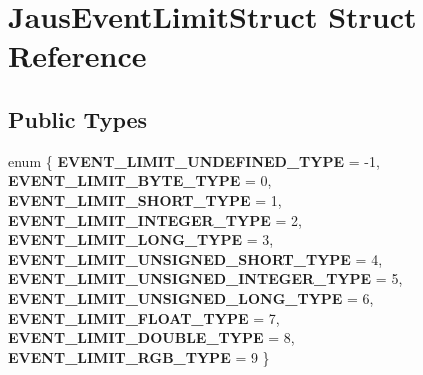 \hypertarget{struct_jaus_event_limit_struct}{\section{\-Jaus\-Event\-Limit\-Struct \-Struct \-Reference}
\label{struct_jaus_event_limit_struct}
}
\subsection*{\-Public \-Types}
\begin{DoxyCompactItemize}
\item 
enum \{ \*
{\bfseries \-E\-V\-E\-N\-T\-\_\-\-L\-I\-M\-I\-T\-\_\-\-U\-N\-D\-E\-F\-I\-N\-E\-D\-\_\-\-T\-Y\-P\-E} =  -\/1, 
{\bfseries \-E\-V\-E\-N\-T\-\_\-\-L\-I\-M\-I\-T\-\_\-\-B\-Y\-T\-E\-\_\-\-T\-Y\-P\-E} =  0, 
{\bfseries \-E\-V\-E\-N\-T\-\_\-\-L\-I\-M\-I\-T\-\_\-\-S\-H\-O\-R\-T\-\_\-\-T\-Y\-P\-E} =  1, 
{\bfseries \-E\-V\-E\-N\-T\-\_\-\-L\-I\-M\-I\-T\-\_\-\-I\-N\-T\-E\-G\-E\-R\-\_\-\-T\-Y\-P\-E} =  2, 
\*
{\bfseries \-E\-V\-E\-N\-T\-\_\-\-L\-I\-M\-I\-T\-\_\-\-L\-O\-N\-G\-\_\-\-T\-Y\-P\-E} =  3, 
{\bfseries \-E\-V\-E\-N\-T\-\_\-\-L\-I\-M\-I\-T\-\_\-\-U\-N\-S\-I\-G\-N\-E\-D\-\_\-\-S\-H\-O\-R\-T\-\_\-\-T\-Y\-P\-E} =  4, 
{\bfseries \-E\-V\-E\-N\-T\-\_\-\-L\-I\-M\-I\-T\-\_\-\-U\-N\-S\-I\-G\-N\-E\-D\-\_\-\-I\-N\-T\-E\-G\-E\-R\-\_\-\-T\-Y\-P\-E} =  5, 
{\bfseries \-E\-V\-E\-N\-T\-\_\-\-L\-I\-M\-I\-T\-\_\-\-U\-N\-S\-I\-G\-N\-E\-D\-\_\-\-L\-O\-N\-G\-\_\-\-T\-Y\-P\-E} =  6, 
\*
{\bfseries \-E\-V\-E\-N\-T\-\_\-\-L\-I\-M\-I\-T\-\_\-\-F\-L\-O\-A\-T\-\_\-\-T\-Y\-P\-E} =  7, 
{\bfseries \-E\-V\-E\-N\-T\-\_\-\-L\-I\-M\-I\-T\-\_\-\-D\-O\-U\-B\-L\-E\-\_\-\-T\-Y\-P\-E} =  8, 
{\bfseries \-E\-V\-E\-N\-T\-\_\-\-L\-I\-M\-I\-T\-\_\-\-R\-G\-B\-\_\-\-T\-Y\-P\-E} =  9
 \}
\end{DoxyCompactItemize}

